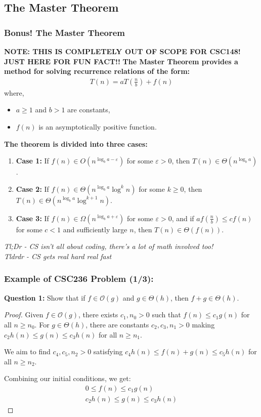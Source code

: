 \documentclass[hyperref={colorlinks,citecolor=blue,linkcolor=blue,urlcolor=blue}, aspectratio=1610]{beamer}
\begin{document}
\subsection{The Master Theorem}
\begin{frame}
  \frametitle{Bonus! The Master Theorem}
  \textbf{NOTE: THIS IS COMPLETELY OUT OF SCOPE FOR CSC148! JUST HERE FOR FUN FACT!!}
  \textbf{The Master Theorem provides a method for solving recurrence relations of the form:}
  \begin{align*}
    T(n) = aT\left(\frac{n}{b}\right) + f(n)
  \end{align*}
  where, 
  \begin{itemize}
    \item $a \geq 1$ and $b > 1$ are constants,
    \item $f(n)$ is an asymptotically positive function.
  \end{itemize}
  
  \textbf{The theorem is divided into three cases:}
  \begin{enumerate}
    \item \textbf{Case 1:} If $f(n) \in O(n^{\log_b a - \varepsilon})$ for some $\varepsilon > 0$, then $T(n) \in \Theta(n^{\log_b a})$.
    \item \textbf{Case 2:} If $f(n) \in \Theta(n^{\log_b a}\log^k n)$ for some $k \geq 0$, then $T(n) \in \Theta(n^{\log_b a}\log^{k+1} n)$.
    \item \textbf{Case 3:} If $f(n) \in \Omega(n^{\log_b a + \varepsilon})$ for some $\varepsilon > 0$, and if $af\left(\frac{n}{b}\right) \leq cf(n)$ for some $c < 1$ and sufficiently large $n$, then $T(n) \in \Theta(f(n))$.
  \end{enumerate}

  \begin{center}
    \textit{Tl;Dr - CS isn't all about coding, there's a lot of math involved too!}\\
    \textit{Tldrdr - CS gets real hard real fast}      
  \end{center}
\end{frame}

\begin{frame}
  \frametitle{Example of CSC236 Problem (1/3):}
  \textbf{Question 1:} Show that if $f \in \mathcal{O}(g)$ and $g \in \Theta(h)$, then $f + g \in \Theta(h)$.

  \begin{proof}
    Given $f \in \mathcal{O}(g)$, there exists $c_1, n_0 > 0$ such that $f(n) \leq c_1g(n)$ for all $n \geq n_0$. For $g \in \Theta(h)$, there are constants $c_2, c_3, n_1 > 0$ making $c_2h(n) \leq g(n) \leq c_3h(n)$ for all $n \geq n_1$.

    We aim to find $c_4, c_5, n_2 > 0$ satisfying $c_4h(n) \leq f(n) + g(n) \leq c_5h(n)$ for all $n \geq n_2$.

    Combining our initial conditions, we get:
    \begin{align*}
        0 \leq f(n) \leq c_1g(n) \\
        c_2h(n) \leq g(n) \leq c_3h(n)
    \end{align*}
  \end{proof}
\end{frame}
\end{document}
